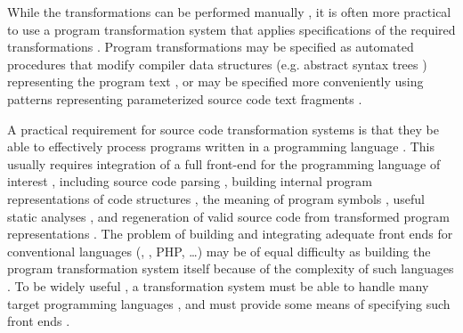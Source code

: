 While the transformations can be performed manually , it is often more practical to use a
program transformation system  that applies specifications of the required trans\-for\-ma\-tions
. Program transformations
 may be specified  as
automated procedures  that modify compiler data
structures  (e.g. abstract
syntax trees ) representing the
program text , or may be specified more
conveniently  using
patterns representing parameterized source code text fragments .

A practical requirement  for source code
trans\-for\-mation systems  is that
they be able  to effectively process programs
 written in a programming language
. This usually requires integration
 of a full front-end for the
programming language of interest , including source code parsing , building internal program representations of code structures
, the meaning of program
symbols , useful static analyses , and regeneration of valid source code  from transformed program representations
. The problem of building and
integrating  adequate front ends for
conventional languages 
(\java, \cpp, PHP, \ldots) may be of equal difficulty  as building the program transformation system itself
 because of the complexity
of such languages . To be widely useful
, a transformation system  must be able to handle many target programming languages
, and must
provide some means of specifying such front ends .

